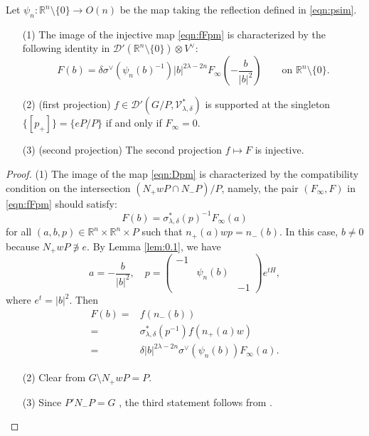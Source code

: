 \begin{lemma}
\label{lem:152341}
Let 
$
\psi_n \colon {\mathbb{R}}^n\setminus \{0\} \to O(n)
$ be the map
 taking the reflection defined in \eqref{eqn:psim}.  

\begin{enumerate}
\item[{\rm{(1)}}]
The image of the injective map \eqref{eqn:fFpm}
 is characterized by the following identity
 in ${\mathcal{D}}'({\mathbb{R}}^n\setminus \{0\}) \otimes V^{\vee}$:
\begin{equation}
\label{eqn:F12}
   F(b)
   =
   \delta \sigma^{\vee}(\psi_n(b)^{-1})
   |b|^{2\lambda-2n}
   F_{\infty}(-\frac{b}{|b|^2})
\qquad
\text{on }
{\mathbb{R}}^n \setminus \{0\}.  
\end{equation}

\item[{\rm{(2)}}]
{\rm{(first projection)}}
$f \in {\mathcal{D}}'(G/P, {\mathcal{V}}_{\lambda, \delta}^{\ast})$
 is supported at the singleton 
$
\{[p_+]\} = \{ e P/P\}
$
 if and only if $F_{\infty}=0$.  
\item[{\rm{(3)}}]
{\rm{(second projection)}}
The second projection $f \mapsto F$ is injective.  
\end{enumerate}
\end{lemma}

\begin{proof}
(1) \enspace
The image of the map \eqref{eqn:Dpm} is characterized
 by the compatibility condition
 on the intersection $(N_+ w P \cap N_- P)/P$, 
 namely, 
 the pair $(F_{\infty}, F)$
 in \eqref{eqn:fFpm} should satisfy:
\[
  F (b)=\sigma_{\lambda,\delta}^{\ast}(p)^{-1} F_{\infty}(a)
\]
for all $(a,b,p) \in {\mathbb{R}}^n \times {\mathbb{R}}^n \times P$
 such that $n_+(a) w p =n_-(b)$.  
In this case, 
 $b \ne 0$
 because $N_+ w P \not \ni e$.  
By Lemma \ref{lem:0.1}, 
we have
\[
a = - \frac{b}{|b|^2}, 
\quad
p= \begin{pmatrix} -1 & & \\
                              & \psi_n(b) & \\
                              &  &  -1 \end{pmatrix} 
        e^{tH}, 
\]
where $e^t = |b|^2$.  
Then 
\begin{align*}
F(b) =& f(n_-(b))
\\
       =& \sigma_{\lambda, \delta}^{\ast}(p^{-1})
        f(n_+(a) w)
\\
       =& \delta|b|^{2\lambda-2n} 
          \sigma^{\vee} (\psi_n(b)) F_{\infty}(a).  
\end{align*}
\begin{enumerate}
\item[(2)]
Clear from $G \setminus N_+ w P=P$.  
\item[(3)]
Since $P' N_-P=G$
\cite[Cor.~5.5]{sbon}, 
the third statement follows from \cite[Thm.~3.16]{sbon}.  
\end{enumerate}
\end{proof}



